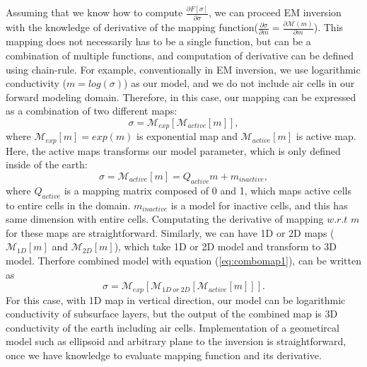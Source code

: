 \documentclass{segabs}
\begin{document}
Assuming that we know how to compute $\frac{\partial F[\sigma]}{\partial \sigma}$, we can proceed EM inversion with the knowledge of derivative of the mapping function($\frac{\partial \sigma}{\partial m} = \frac{\partial \mathcal{M}(m)}{\partial m}$).
This mapping does not necessarily has to be a single function, but can be a combination of multiple functions, and computation of derivative can be defined using chain-rule. For example, conventionally in EM inversion, we use logarithmic conductivity ($m = log(\sigma)$) as our model, and we do not include air cells in our forward modeling domain. Therefore, in this case, our mapping can be expressed as a combination of two different maps:
\begin{equation}
  \sigma = \mathcal{M}_{exp}[\mathcal{M}_{active}[m]],
  \label{eq:combomap1}
\end{equation}
where $\mathcal{M}_{exp}[m]=exp(m)$ is exponential map and $\mathcal{M}_{active}[m]$ is active map. Here, the active maps transforms our model parameter, which is only defined inside of the earth:
\begin{equation}
  \sigma = \mathcal{M}_{active}[m] = Q_{active}m + m_{inactive},
\end{equation}
where $Q_{active}$ is a mapping matrix composed of 0 and 1, which maps active cells to entire cells in the domain. $m_{inactive}$ is a model for inactive cells, and this has same dimension with entire cells. Computating the derivative of mapping $w.r.t$ $m$ for these maps are straightforward. Similarly, we can have 1D or 2D maps ($\mathcal{M}_{1D}[m]$ and $\mathcal{M}_{2D}[m]$), which take 1D or 2D model and transform to 3D model. Therfore combined model with equation (\ref{eq:combomap1}), can be written as
\begin{equation}
  \sigma = \mathcal{M}_{exp}[\mathcal{M}_{1D \ or \ 2D}[\mathcal{M}_{active}[m]]].
  \label{eq:combomap2}
\end{equation}
For this case, with 1D map in vertical direction, our model can be logarithmic conductivity of subsurface layers, but the output of the combined map is 3D conductivity of the earth including air cells. Implementation of a geometircal model such as ellipsoid and arbitrary plane to the inversion is straightforward, once we have knowledge to evaluate mapping function and its derivative.
\end{document}
